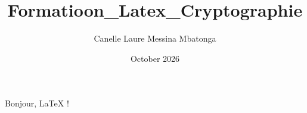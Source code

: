 \documentclass{article}
\title{Formatioon_Latex_Cryptographie}
\author{Canelle Laure Messina Mbatonga}
\date{October 2026}
\begin{document}
Bonjour, \LaTeX{} !
\end{document}
